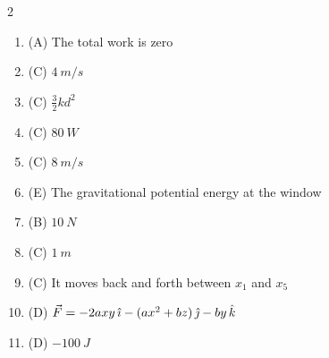 \documentclass[11pt,a4paper]{article}
\begin{document}
\begin{multicols}{2}
\begin{enumerate}[label=\textsf{\arabic*.},leftmargin=2.2em,itemsep=0.35em]
\item (A) \enspace The total work is zero
\item (C) \enspace $\qty{4}{m/s}$
\item (C) \enspace $\tfrac32 kd^2$
\item (C) \enspace $\qty{80}{W}$
\item (C) \enspace $\qty{8}{m/s}$
\item (E) \enspace The gravitational potential energy at the window
\item (B) \enspace $\qty{10}{N}$
\item (C) \enspace $\qty{1}{m}$
\item (C) \enspace It moves back and forth between $x_1$ and $x_5$
\item (D) \enspace $\vec{F} = -2axy\,\hat{\imath} - (ax^2 + bz)\,\hat{\jmath} - by\,\hat{k}$
\item (D) \enspace $\qty{-100}{J}$
\end{enumerate}
\end{multicols}
\end{document}
